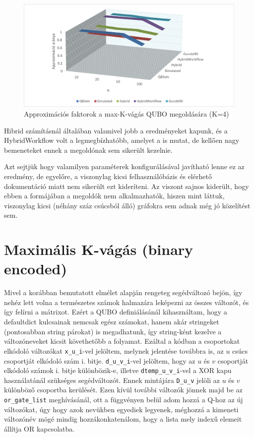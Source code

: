 \begin{figure}[!ht]
	\centering
	\includegraphics[width=150mm, keepaspectratio]{figures/diagrams/maxKCutQUBO_K4approx.png}
	\caption{Approximációs faktorok a max-K-vágás QUBO megoldására (K=4)}
	\label{fig:maxKCutQUBO_K4approx}
\end{figure}

Hibrid számításnál általában valamivel jobb a eredményeket kapunk, és a HybridWorkflow volt a legmegbízhatóbb, amelyet a  is mutat, de kellően nagy bemeneteket ennek a megoldónak sem sikerült kezelnie.

Azt sejtjük hogy valamilyen paraméterek konfigurálásával javítható lenne ez az eredmény, de egyelőre, a viszonylag kicsi felhasználóbázis és elérhető dokumentáció miatt nem sikerült ezt kideríteni. Az viszont sajnos kiderült, hogy ebben a formájában a megoldók nem alkalmazhatók, hiszen mint láttuk, viszonylag kicsi (néhány száz csúcsból álló) gráfokra sem adnak még jó közelítést sem.

\section{Maximális K-vágás (binary encoded)}\label{sec:practiceBinary}

Mivel a korábban bemutatott elmélet alapján rengeteg segédváltozó bejön, így nehéz lett volna a természetes számok halmazára leképezni az összes változót, és így felírni a mátrixot. Ezért a QUBO definiálásánál kihasználtam, hogy a defaultdict kulcsainak nemcsak egész számokat, hanem akár stringeket (pontosabban string párokat) is megadhatunk, így string-ként kezelve a változóneveket kicsit követhetőbb a folyamat. Ezáltal a kódban a csoportokat elkódoló változókat \verb+x_u_i+-vel jelöltem, melynek jelentése továbbra is, az $u$ csúcs csoportját elkódoló szám i. bitje. \verb+d_u_v_i+-vel jelöltem, hogy az $u$ és $v$ csoportját elkódoló számok i. bitje különbözik-e, illetve \verb+dtemp_u_v_i+-vel a XOR kapu használatánál szükséges segédváltozót. Ennek mintájára \verb+D_u_v+ jelöli az $u$ és $v$ különböző csoportba kerülését. Ezen kívül további változók jönnek majd be az \verb+or_gate_list+ meghívásánál, ott a függvényen belül adom hozzá a Q-hoz az új változókat, úgy hogy azok nevükben egyediek legyenek, méghozzá a kimeneti változónév mögé mindig hozzákonkatenálom, hogy a lista mely indexű elemeit állítja OR kapcsolatba.

